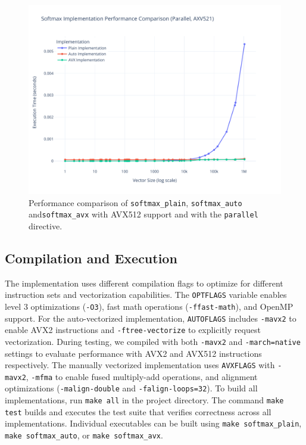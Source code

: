 \documentclass[10pt]{article}
\begin{document}
\begin{figure}[h!]
  \centering
  \includegraphics[width=\textwidth]{../images/softmax_parallel_axv521.pdf}
  \caption{Performance comparison of \texttt{softmax\_plain}, \texttt{softmax\_auto} and\texttt{softmax\_avx} with AVX512 support and with the \texttt{parallel} directive.}
  \label{fig:softmax_auto_avx512_parallel}
\end{figure}

\subsection{Compilation and Execution}
The implementation uses different compilation flags to optimize for different instruction sets and vectorization capabilities. The \texttt{OPTFLAGS} variable enables level 3 optimizations (\texttt{-O3}), fast math operations (\texttt{-ffast-math}), and OpenMP support. For the auto-vectorized implementation, \texttt{AUTOFLAGS} includes \texttt{-mavx2} to enable AVX2 instructions and \texttt{-ftree-vectorize} to explicitly request vectorization. During testing, we compiled with both \texttt{-mavx2} and \texttt{-march=native} settings to evaluate performance with AVX2 and AVX512 instructions respectively. The manually vectorized implementation uses \texttt{AVXFLAGS} with \texttt{-mavx2}, \texttt{-mfma} to enable fused multiply-add operations, and alignment optimizations (\texttt{-malign-double} and \texttt{-falign-loops=32}). To build all implementations, run \texttt{make all} in the project directory. The command \texttt{make test} builds and executes the test suite that verifies correctness across all implementations. Individual executables can be built using \texttt{make softmax\_plain}, \texttt{make softmax\_auto}, or \texttt{make softmax\_avx}.
\end{document}
